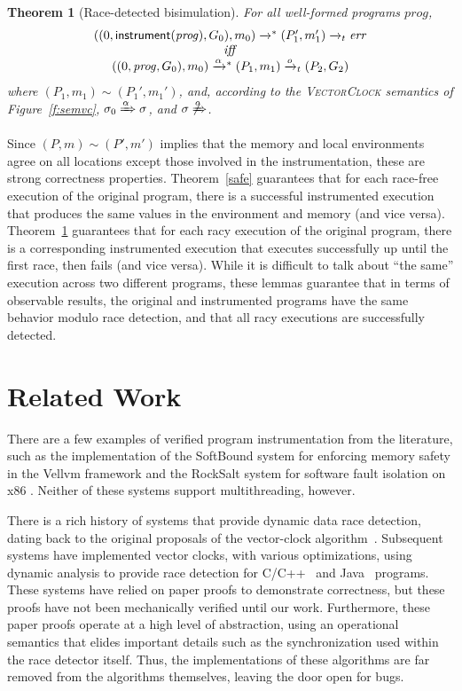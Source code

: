 \documentclass[preprint, 10pt]{sigplanconf}
\newcommand{\VCalg}{\textsc{VectorClock}\xspace}
\newcommand{\instrp}[1]{\ensuremath{\mathsf{instrument}(#1)}}
\newcommand{\cfg}[2]{\ensuremath{(#1, #2)}}
\newcommand{\execstar}[4]{\ensuremath{\cfg{#1}{#2} \tto{#3} #4}}
\newcommand{\execs}[3]{\ensuremath{ \xrightarrow{#2}_{#1} #3}}
\newcommand{\tto}[1]{\mathrel{
  \vphantom{\xrightarrow{#1}}
  \smash{\xrightarrow{#1}}
  \vphantom{\to}^{*}}
}
\newtheorem{theorem}{Theorem}
\begin{document}
\begin{theorem}[Race-detected bisimulation]\label{race}For all well-formed programs $\mathit{prog}$, 
\[
\begin{array}{c}
\execstar{(0, \instrp{\mathit{prog}}, G_0)}{m_0}{}{(P_1', m_1')} \execs{t}{}{\mathit{err}}\\ 
\mathit{iff} \\ 
\execstar{(0, \mathit{prog}, G_0)}{m_0}{\alpha}{(P_1, m_1)} \execs{t}{o}{(P_2, G_2)}
\end{array}
\]
%
where $(P_1, m_1) \sim (P_1', m_1')$, and, according to the \VCalg semantics of Figure~\ref{f:semvc}, $\sigma_0 \xRightarrow{\alpha} \sigma$, and $\sigma \not\xRightarrow{o}$.

\end{theorem}
Since $(P, m) \sim (P', m')$ implies that the memory and local environments agree on all locations except those involved in the instrumentation, these are strong correctness properties. Theorem~\ref{safe} guarantees that for each race-free execution of the original program, there is a successful instrumented execution that produces the same values in the environment and memory (and vice versa). Theorem~\ref{race} guarantees that for each racy execution of the original program, there is a corresponding instrumented execution that executes successfully up until the first race, then fails (and vice versa). While it is difficult to talk about ``the same'' execution across two different programs, these lemmas guarantee that in terms of observable results, the original and instrumented programs have the same behavior modulo race detection, and that all racy executions are successfully detected.

\section{Related Work}
\label{related}

There are a few examples of verified program instrumentation from the literature, such as
the implementation of the SoftBound system for enforcing memory safety in the Vellvm framework \cite{vellvm} and the RockSalt system for software fault isolation on x86 \cite{Morrisett:2012:RBF:2254064.2254111}. Neither of these systems support multithreading, however.

There is a rich history of systems that provide dynamic data race detection, dating back to the original proposals of the vector-clock algorithm~\cite{vcfidge,vcmattern,lamporthb}. Subsequent systems have implemented vector clocks, with various optimizations, using dynamic analysis to provide race detection for C/C++~\cite{pozniansky_efficient_2003,serebryany_threadsanitizer:_2009} and Java~\cite{christiaens_trade:_2001,elmas_goldilocks:_2007,fasttrack,flanagan_fasttrack:_2010,slimstate} programs. These systems have relied on paper proofs to demonstrate correctness, but these proofs have not been mechanically verified until our work. Furthermore, these paper proofs operate at a high level of abstraction, using an operational semantics that elides important details such as the synchronization used within the race detector itself. Thus, the implementations of these algorithms are far removed from the algorithms themselves, leaving the door open for bugs.
\end{document}
